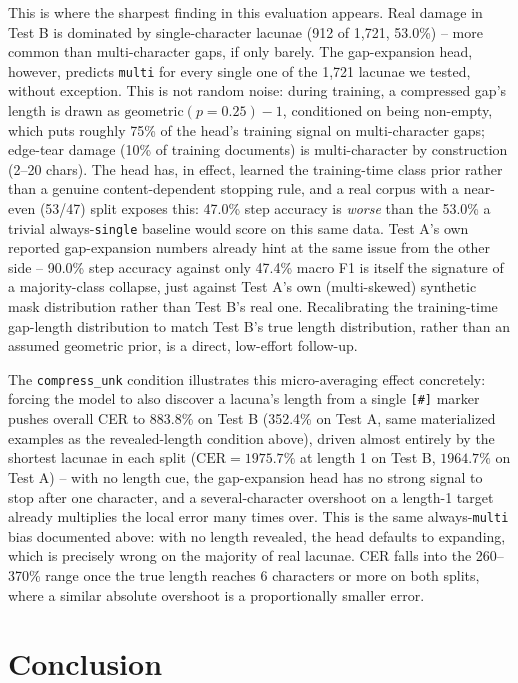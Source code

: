 \documentclass{article}
\begin{document}
This is where the sharpest finding in this evaluation appears. Real damage in Test B is dominated by single-character lacunae (912 of 1{,}721, 53.0\%) -- more common than multi-character gaps, if only barely. The gap-expansion head, however, predicts \texttt{multi} for every single one of the 1{,}721 lacunae we tested, without exception. This is not random noise: during training, a compressed gap's length is drawn as $\mathrm{geometric}(p{=}0.25) - 1$, conditioned on being non-empty, which puts roughly 75\% of the head's training signal on multi-character gaps; edge-tear damage (10\% of training documents) is multi-character by construction (2--20 chars). The head has, in effect, learned the training-time class prior rather than a genuine content-dependent stopping rule, and a real corpus with a near-even (53/47) split exposes this: 47.0\% step accuracy is \emph{worse} than the 53.0\% a trivial always-\texttt{single} baseline would score on this same data. Test A's own reported gap-expansion numbers already hint at the same issue from the other side -- 90.0\% step accuracy against only 47.4\% macro F1 is itself the signature of a majority-class collapse, just against Test A's own (multi-skewed) synthetic mask distribution rather than Test B's real one. Recalibrating the training-time gap-length distribution to match Test B's true length distribution, rather than an assumed geometric prior, is a direct, low-effort follow-up.

The \texttt{compress\_unk} condition illustrates this micro-averaging effect concretely: forcing the model to also discover a lacuna's length from a single \texttt{[\#]} marker pushes overall CER to 883.8\% on Test B (352.4\% on Test A, same materialized examples as the revealed-length condition above), driven almost entirely by the shortest lacunae in each split ($\mathrm{CER}=1975.7\%$ at length 1 on Test B, $1964.7\%$ on Test A) -- with no length cue, the gap-expansion head has no strong signal to stop after one character, and a several-character overshoot on a length-1 target already multiplies the local error many times over. This is the same always-\texttt{multi} bias documented above: with no length revealed, the head defaults to expanding, which is precisely wrong on the majority of real lacunae. CER falls into the 260--370\% range once the true length reaches 6 characters or more on both splits, where a similar absolute overshoot is a proportionally smaller error.

\section{Conclusion}
\end{document}
